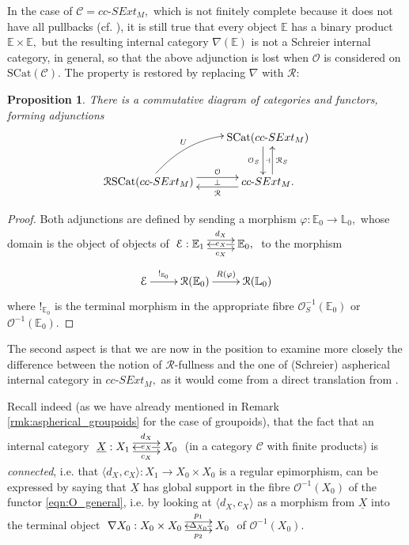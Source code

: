 \documentclass[a4paper]{amsart}
\theoremstyle{plain}
\newtheorem{proposition}[subsection]{Proposition}
\theoremstyle{definition}
\theoremstyle{remark}
\newcommand{\la}{\langle}
\newcommand{\ra}{\rangle}
\begin{document}
In the case of $\mathcal{C}=cc\text{-}SExt_M,$ which is not finitely complete because it does not have all pullbacks (cf. \cite[Appendix]{AMR}), it is still true that every object $\mathbb{E}$ has a binary product $\mathbb{E}\times\mathbb{E},$ but the resulting internal category $\nabla(\mathbb{E})$ is not a Schreier internal category, in general, so that the above adjunction is lost when $\mathcal{O}$ is considered on $\mathrm{SCat}(\mathcal{C}).$ The property is restored by replacing $\nabla$ with $\mathcal{R}$:
\begin{proposition}
There is a commutative diagram of categories and functors, forming adjunctions
\begin{equation*}
\begin{aligned}
\xymatrix{
&{\mathrm{SCat}(cc\text{-}SExt_M)} \ar@<-.99ex>[d]_-{\mathcal{O}_S} \ar@{}[d]|-{\dashv} \\
{\mathcal{R}\mathrm{SCat}(cc\text{-}SExt_M)} \ar@/^1.5pc/[ru]^-{U} \ar@<.99ex>[r]^-{\mathcal{O}}  &{cc\text{-}SExt_M.} \ar@<.99ex>[l]^-{\mathcal{R}} \ar@<-.99ex>[u]_-{\mathcal{R}_S}   \ar@{}[l]|-{\bot}
}
\end{aligned}
\end{equation*}
\end{proposition}
\begin{proof}
Both adjunctions are defined by sending a morphism $\varphi\colon {\mathbb{E}}_0\longrightarrow {\mathbb{L}}_0,$ whose domain is the object of objects of $\xymatrix{ {\mathcal{E}:{\mathbb{E}}_1} \ar@<.9ex>[r]^-{d_X} \ar@<-.9ex>[r]_-{c_X} &{{\mathbb{E}}_0,} \ar[l]|-{e_X}
}$ to the morphism
\begin{equation*}
\xymatrix{ {\mathcal{E}} \ar[r]^-{!_{{\mathbb{E}}_0}} &{\mathcal{R}({\mathbb{E}}_0)} \ar[r]^-{R(\varphi)} &{\mathcal{R}({\mathbb{L}}_0)} }
\end{equation*}
where $!_{{\mathbb{E}}_0}$ is the terminal morphism in the appropriate fibre $\mathcal{O}_S^{-1}({\mathbb{E}}_0)$ or $\mathcal{O}^{-1}({\mathbb{E}}_0).$
\end{proof}
The second aspect is that we are now in the position to examine more closely the difference between the notion of $\mathcal{R}$-fullness and the one of (Schreier) aspherical internal category in $cc\text{-}SExt_M,$ as it would come from a direct translation from \cite{aspherical}.

Recall indeed (as we have already mentioned in Remark \ref{rmk:aspherical_groupoids} for the case of groupoids), that the fact that an internal category $\xymatrix{{\underline{X}:X_1} \ar@<.9ex>[r]^-{d_X} \ar@<-.9ex>[r]_-{c_X} &{X_0} \ar[l]|-{e_X}}$ (in a category $\mathcal{C}$ with finite products) is \emph{connected}, i.e. that $\la d_X,c_X\ra\colon X_1\longrightarrow X_0\times X_0$ is a regular epimorphism, can be expressed by saying that $\underline{X}$ has global support in the fibre $\mathcal{O}^{-1}(X_0)$ of the functor \eqref{eqn:O_general}, i.e. by looking at $\la d_X,c_X\ra$ as a morphism from $\underline{X}$ into the terminal object $\xymatrix{{\nabla{X_0}:X_0\times X_0} \ar@<.9ex>[r]^-{p_1} \ar@<-.9ex>[r]_-{p_2} &{X_0} \ar[l]|-{\Delta_{X_0}}}$ of $\mathcal{O}^{-1}(X_0).$
\end{document}
